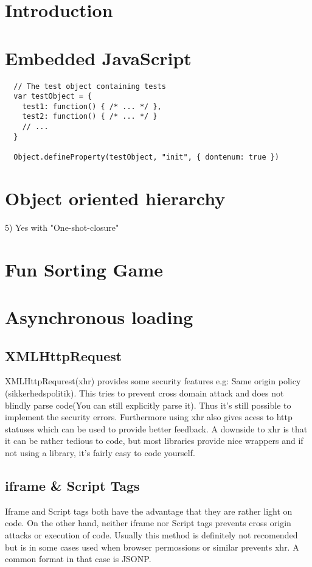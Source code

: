 \documentclass[a4paper,10pt]{article}
\author{
Søren Krogh -  20105661 \\
Emil Madsen - 20105376  \\
K. Rohde Fischer - 20052356\\}
\title{}
\begin{document}
\maketitle

\section*{Introduction}


\section*{Embedded JavaScript}

\begin{verbatim}
  // The test object containing tests
  var testObject = {
    test1: function() { /* ... */ },
    test2: function() { /* ... */ }
    // ...
  }

  Object.defineProperty(testObject, "init", { dontenum: true })
\end{verbatim}


\section*{Object oriented hierarchy}
5) Yes with "One-shot-closure"


\section*{Fun Sorting Game}


\section*{Asynchronous loading}
\subsection*{XMLHttpRequest}
  XMLHttpRequrest(xhr) provides some security features e.g:
Same origin policy (sikkerhedspolitik). This tries to prevent cross domain attack and does not blindly parse code(You can still explicitly parse it). Thus it's still possible to implement the security errors.
Furthermore using xhr also gives acess to http statuses which can be used to provide better feedback.
A downside to xhr is that it can be rather tedious to code, but most libraries provide nice wrappers and if not using a library, it's fairly easy to code yourself.

\subsection*{iframe \& Script Tags}
Iframe and Script tags both have the advantage that they are rather light on code. On the other hand, neither iframe nor Script tags prevents cross origin attacks or execution of code. Usually this method is definitely not recomended but is in some cases used when browser permossions or similar prevents xhr. A common format in that case is JSONP.
\end{document}
